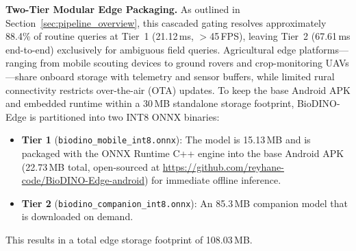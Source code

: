 \documentclass[conference]{IEEEtran}
\begin{document}
\medskip
\textbf{Two-Tier Modular Edge Packaging.} As outlined in Section~\ref{sec:pipeline_overview}, this cascaded gating resolves approximately 88.4\% of routine queries at Tier~1 (21.12\,ms, $>$45\,FPS), leaving Tier~2 (67.61\,ms end-to-end) exclusively for ambiguous field queries. Agricultural edge platforms---ranging from mobile scouting devices to ground rovers and crop-monitoring UAVs---share onboard storage with telemetry and sensor buffers, while limited rural connectivity restricts over-the-air (OTA) updates. To keep the base Android APK and embedded runtime within a 30\,MB standalone storage footprint, BioDINO-Edge is partitioned into two INT8 ONNX binaries:
\begin{itemize}
    \item \textbf{Tier 1} (\texttt{biodino\_\allowbreak mobile\_\allowbreak int8.onnx}): The model is 15.13\,MB and is packaged with the ONNX Runtime C++ engine into the base Android APK (22.73\,MB total, open-sourced at \url{https://github.com/reyhane-code/BioDINO-Edge-android}) for immediate offline inference.
    \item \textbf{Tier 2} (\texttt{biodino\_\allowbreak comp\allowbreak anion\_\allowbreak int8.onnx}): An 85.3\,MB companion model that is downloaded on demand.
\end{itemize}
This results in a total edge storage footprint of 108.03\,MB.



\end{document}
